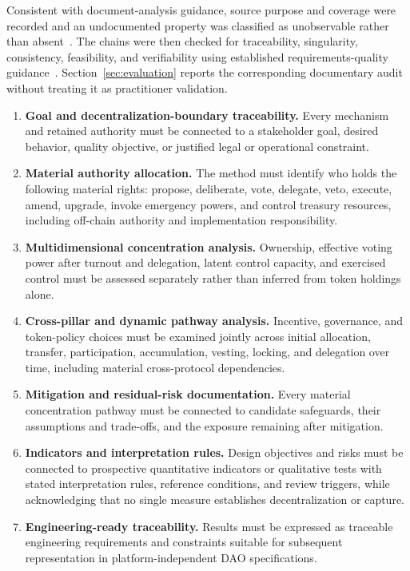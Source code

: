 \documentclass[referee,sn-basic]{sn-jnl}
\begin{document}
Consistent with document-analysis guidance, source purpose and coverage were
recorded and an undocumented property was classified as unobservable rather
than absent~\cite{Bowen2009}. The chains were then checked for traceability,
singularity, consistency, feasibility, and verifiability using established
requirements-quality guidance~\cite{ISO29148}. Section~\ref{sec:evaluation}
reports the corresponding documentary audit without treating it as practitioner
validation.

\begin{enumerate}
  \item[DR1.] \textbf{Goal and decentralization-boundary traceability.} Every
  mechanism and retained authority must be connected to a stakeholder goal,
  desired behavior, quality objective, or justified legal or operational
  constraint.
  \item[DR2.] \textbf{Material authority allocation.} The method must identify
  who holds the following material rights: propose, deliberate, vote, delegate,
  veto, execute, amend, upgrade,
  invoke emergency powers, and control treasury resources, including off-chain
  authority and implementation responsibility.
  \item[DR3.] \textbf{Multidimensional concentration analysis.} Ownership,
  effective voting power after turnout and delegation, latent control capacity,
  and exercised control must be assessed separately rather than inferred from
  token holdings alone.
  \item[DR4.] \textbf{Cross-pillar and dynamic pathway analysis.} Incentive,
  governance, and token-policy choices must be examined jointly across initial
  allocation, transfer, participation, accumulation, vesting, locking, and
  delegation over time, including material cross-protocol dependencies.
  \item[DR5.] \textbf{Mitigation and residual-risk documentation.} Every
  material concentration pathway must be connected to candidate safeguards,
  their assumptions and trade-offs, and the exposure remaining after
  mitigation.
  \item[DR6.] \textbf{Indicators and interpretation rules.} Design objectives
  and risks must be connected to prospective quantitative indicators or
  qualitative tests with stated interpretation rules, reference conditions, and
  review triggers, while acknowledging that no single measure establishes
  decentralization or capture.
  \item[DR7.] \textbf{Engineering-ready traceability.} Results must be expressed
  as traceable engineering requirements and constraints suitable for subsequent
  representation in platform-independent DAO specifications.
\end{enumerate}
\end{document}
